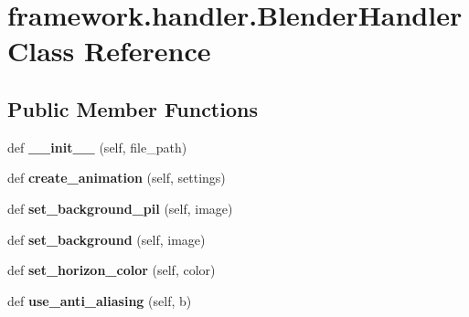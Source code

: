 \hypertarget{classframework_1_1handler_1_1BlenderHandler}{}\section{framework.\+handler.\+Blender\+Handler Class Reference}
\label{classframework_1_1handler_1_1BlenderHandler}
\subsection*{Public Member Functions}
\begin{DoxyCompactItemize}
\item 
def {\bfseries \+\_\+\+\_\+init\+\_\+\+\_\+} (self, file\+\_\+path)\hypertarget{classframework_1_1handler_1_1BlenderHandler_a278091e459b1cd913866b7241edf14cd}{}\label{classframework_1_1handler_1_1BlenderHandler_a278091e459b1cd913866b7241edf14cd}

\item 
def {\bfseries create\+\_\+animation} (self, settings)\hypertarget{classframework_1_1handler_1_1BlenderHandler_a004a990458b664819ce6d8c26437a2dd}{}\label{classframework_1_1handler_1_1BlenderHandler_a004a990458b664819ce6d8c26437a2dd}

\item 
def {\bfseries set\+\_\+background\+\_\+pil} (self, image)\hypertarget{classframework_1_1handler_1_1BlenderHandler_ac27242ac703b4a73da0e10ce7c9c6a00}{}\label{classframework_1_1handler_1_1BlenderHandler_ac27242ac703b4a73da0e10ce7c9c6a00}

\item 
def {\bfseries set\+\_\+background} (self, image)\hypertarget{classframework_1_1handler_1_1BlenderHandler_a2fbbdc544511c3636244b57d3b784d39}{}\label{classframework_1_1handler_1_1BlenderHandler_a2fbbdc544511c3636244b57d3b784d39}

\item 
def {\bfseries set\+\_\+horizon\+\_\+color} (self, color)\hypertarget{classframework_1_1handler_1_1BlenderHandler_ac08044ebf42a75a6751e15b88930b4be}{}\label{classframework_1_1handler_1_1BlenderHandler_ac08044ebf42a75a6751e15b88930b4be}

\item 
def {\bfseries use\+\_\+anti\+\_\+aliasing} (self, b)\hypertarget{classframework_1_1handler_1_1BlenderHandler_a717966d6463449793037736c4a9f3d8a}{}\label{classframework_1_1handler_1_1BlenderHandler_a717966d6463449793037736c4a9f3d8a}


\end{DoxyCompactItemize}
